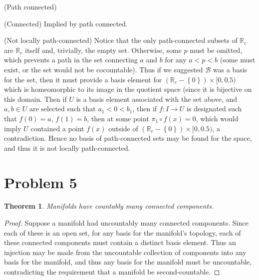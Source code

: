 \documentclass{article}
\newtheorem{theorem}[subsection]{Theorem}
\theoremstyle{definition}
\newcommand{\R}{\mathbb{R}}
\newcommand{\p}[1]{\left(#1\right)}
\newcommand{\set}[1]{\left\{#1\right\}}
\begin{document}
(Path connected)

(Connected) 
Implied by path connected.

(Not locally path-connected)
Notice that the only path-connected subsets of $\R_c$ are $\R_c$ itself and,
trivially, the empty set. Otherwise, some $p$ must be omitted, which prevents
a path in the set connecting $a$ and $b$ for any $a<p<b$ (some must exist, or
the set would not be cocountable). Thus if we suggested $\mathcal{B}$ was a 
basis for the set, then it must provide a basis element for 
$\p{\R_c-\set{0}} \times [0,0.5)$ which is homeomorphic to its image in the
quotient space (since it is bijective on this domain. Then if $U$ is a basis
element associated with the set above, and $a,b \in U$ are selected such that
$a_1 < 0 < b_1$, then if $f : I \to U$ is designated such that $f(0)=a$,
$f(1)=b$, then at some point $\pi_1 \circ f (x) = 0$, which would imply $U$
contained a point $f(x)$ outside of $\p{\R_c-\set{0}} \times [0,0.5)$, 
a contradiction. Hence no basis of path-connected sets may be found for 
the space, and thus it is not locally path-connected. 

\section{Problem 5}
\begin{theorem}
Manifolds have countably many connected components.
\end{theorem}
\begin{proof}
Suppose a manifold had uncountably many connected components. Since each
of these is an open set, for any basis for the manifold's topology, 
each of these connected components must contain a distinct basis
element. Thus an injection may be made from the uncountable collection
of components into any basis for the manifold, and thus any basis
for the manifold must be uncountable, contradicting the requirement
that a manifold be second-countable.
\end{proof}
\end{document}
